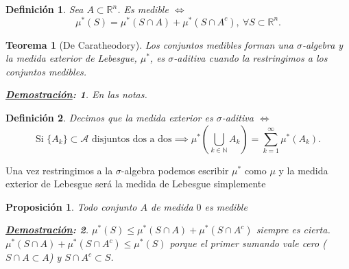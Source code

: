 \documentclass[10pt,a4paper,openright]{book}
\theoremstyle{break}
\newtheorem*{defi}{Definición}
\newtheorem*{theo}{Teorema}
\newtheorem*{prop}{Proposición}
\newtheorem*{demo}{\underline{Demostración}:}
\begin{document}
\begin{defi}
    Sea $A \subset \mathbb{R}^n$. Es medible $\iff$\[
    \mu^*\left( S \right) = \mu^*\left( S\cap A \right) + \mu^*\left( S \cap A^c \right),\ \forall S \subset \mathbb{R}^n
    .\] 
\end{defi}

\begin{theo}[De Caratheodory]
   Los conjuntos medibles forman una $\sigma$-algebra y la medida exterior de Lebesgue, 
   $\mu^*$, es $ \sigma$-aditiva cuando la restringimos a los conjuntos medibles.
   \begin{demo}
       En las notas.
   \end{demo}
\end{theo}

\begin{defi}
    Decimos que la medida exterior es $ \sigma$-aditiva $ \iff$\[
    \text{Si } \{A_k\}\subset \mathcal{A} \text{ disjuntos dos a dos} \implies \mu^*\left( \bigcup_{k \in \mathbb{N}} A_k  \right) = \sum_{k=1}^{\infty} \mu^*\left( A_k \right)
    .\] 
\end{defi}
Una vez restringimos a la $ \sigma$-algebra podemos escribir $\mu^*$ como $\mu$ y la
medida exterior de Lebesgue será la medida de Lebesgue simplemente

\begin{prop}
    Todo conjunto $A$ de medida $0$ es medible
    \begin{demo}
        $ \mu^*\left( S \right) \le \mu^*\left( S\cap A \right) + \mu^*\left( S\cap A^c \right)$ siempre es cierta.\\
        $ \mu^*\left( S\cap A \right) + \mu^*\left( S\cap A^c \right) \le \mu^*\left( S \right) $ porque el primer sumando vale cero ($S\cap A \subset A$) y $S \cap A^c \subset S$.
    \end{demo}
\end{prop}
\end{document}

